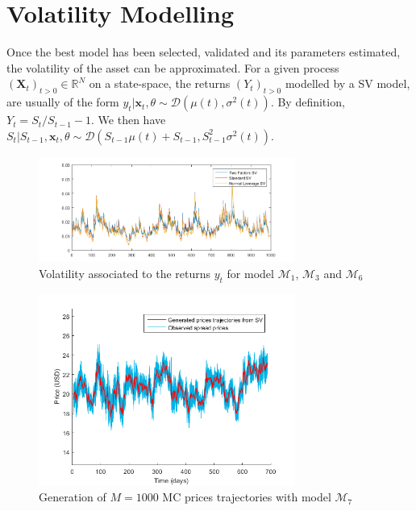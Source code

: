 \documentclass[11pt,a4,twosided,singlespacing,titlepagenumber=on]{scrreprt}
\numberwithin{equation}{chapter} %
\theoremstyle{remark}
\newcommand{\matr}[1]{\mathbf{#1}}
\begin{document}
\section{Volatility Modelling}
Once the best model has been selected, validated and its parameters estimated, the volatility of the asset can be approximated. For a given process $(\matr{X}_t)_{t>0} \in \mathbb{R}^N$ on a state-space, the returns $(Y_t)_{t>0}$ modelled by a SV model, are usually of the form $y_t | \matr{x}_t, \theta \sim \mathcal{D}(\mu(t), \sigma^2(t))$. By definition, $Y_t = S_t / S_{t-1} - 1$. We then have $S_t | S_{t-1}, \matr{x}_t, \theta \sim \mathcal{D}(S_{t-1} \mu(t)+S_{t-1}, S_{t-1}^2 \sigma^2(t))$.

\begin{figure}[H]
\centering
\includegraphics[width = 0.75\textwidth]{appl_vol_3_models}
\caption{Volatility associated to the returns $y_t$ for model $\mathcal{M}_1$, $\mathcal{M}_3$ and $\mathcal{M}_6$}
\label{appl_vol_3_models}
\end{figure}

\begin{figure}[H]
\centering
\includegraphics[width = 0.75\textwidth]{model_vol/1}
\caption{Generation of $M = 1000$ MC prices trajectories with model $\mathcal{M}_7$}
\label{vol_mod_1}
\end{figure}
\end{document}

